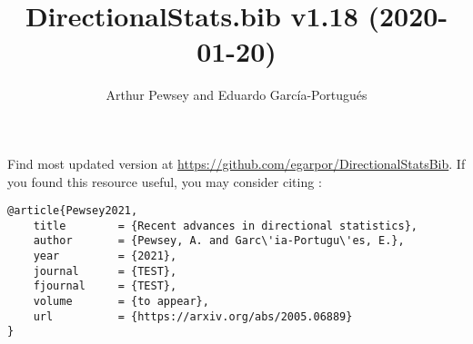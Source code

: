 \documentclass[10pt]{article}
\title{DirectionalStats.bib v1.18 (2020-01-20)}
\author{Arthur Pewsey and Eduardo García-Portugués}
\date{}
\begin{document}
\maketitle

Find most updated version at \url{https://github.com/egarpor/DirectionalStatsBib}. If you found this resource useful, you may consider citing \cite{Pewsey2021}:
\begin{verbatim}
@article{Pewsey2021,
    title        = {Recent advances in directional statistics},
    author       = {Pewsey, A. and Garc\'ia-Portugu\'es, E.},
    year         = {2021},
    journal      = {TEST},
    fjournal     = {TEST},
    volume       = {to appear},
    url          = {https://arxiv.org/abs/2005.06889}
}
\end{verbatim}

\nocite{*}

\setlength\bibsep{0cm}
\setlength\bibhang{0.25cm}



\end{document}
